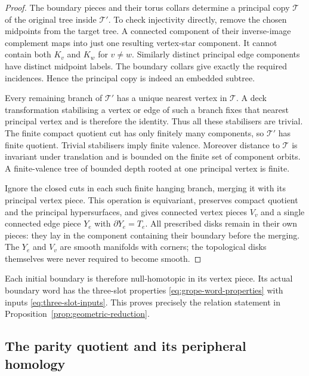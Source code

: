 \begin{proof}
The boundary pieces and their torus collars determine a principal copy
\(\mathcal T\) of the original tree inside \(\mathcal T'\).
To check injectivity directly, remove the chosen midpoints from the
target tree. A connected component of their inverse-image complement
maps into just one resulting vertex-star component. It cannot contain
both \(K_v\) and \(K_w\) for \(v\ne w\). Similarly distinct principal
edge components have distinct midpoint labels. The boundary collars
give exactly the required incidences. Hence the principal copy is
indeed an embedded subtree.

Every remaining branch of \(\mathcal T'\) has a unique nearest vertex in
\(\mathcal T\). A deck transformation stabilising a vertex or edge of
such a branch fixes that nearest principal vertex and is therefore the
identity. Thus all these stabilisers are trivial. The finite compact
quotient cut has only finitely many components, so \(\mathcal T'\)
has finite quotient. Trivial stabilisers imply finite valence.
Moreover distance to \(\mathcal T\) is invariant under translation and
is bounded on the finite set of component orbits. A finite-valence tree
of bounded depth rooted at one principal vertex is finite.

Ignore the closed cuts in each such finite hanging branch, merging it
with its principal vertex piece. This operation is equivariant, preserves
compact quotient and the principal hypersurfaces, and gives connected
vertex pieces \(V_v\) and a single connected edge piece \(Y_e\) with
\(\partial Y_e=T_e\). All prescribed disks remain in their own pieces:
they lay in the component containing their boundary before the merging.
The \(Y_e\) and \(V_v\) are smooth manifolds with corners; the topological
disks themselves were never required to become smooth.
\end{proof}

Each initial boundary is therefore null-homotopic in its vertex piece.
Its actual boundary word has the three-slot properties
\eqref{eq:grope-word-properties} with inputs
\eqref{eq:three-slot-inputs}. This proves precisely the relation statement
in Proposition~\ref{prop:geometric-reduction}.

\subsection{The parity quotient and its peripheral homology}


